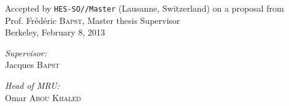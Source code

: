\begin{center}

\vspace*{\fill} 

Accepted by \texttt{HES-SO//Master} (Lausanne, Switzerland) on a proposal from \\[5mm]

{\large Prof. Frédéric \textsc{Bapst}, Master thesis Supervisor} \\[4cm]


{\Large Berkeley, February 8, 2013} \\[4cm]

\begin{minipage}{0.4\textwidth}
\begin{flushleft} \large
\emph{Supervisor:}\\
Jacques \textsc{Bapst}
\end{flushleft}
\end{minipage}
\begin{minipage}{0.4\textwidth}
\begin{flushright} \large
\emph{Head of MRU:} \\
Omar \textsc{Abou Khaled}
\end{flushright}
\end{minipage}

\vspace*{\fill} 

\end{center}
